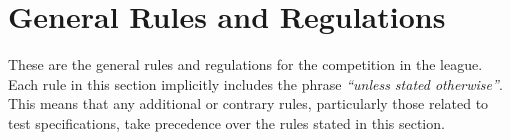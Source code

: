 \chapter{General Rules and Regulations}\label{chap:rules}

These are the general rules and regulations for the competition in the \RoboCup\AtHome{} league.
Each rule in this section implicitly includes the phrase \emph{\enquote{unless stated otherwise}}.
This means that any additional or contrary rules, particularly those related to test specifications, take precedence over the rules stated in this section.



%
















%
